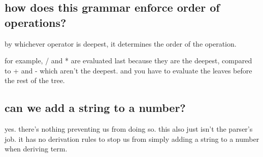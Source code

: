 \documentclass[12pt]{article}
\begin{document}
\subsection*{how does this grammar enforce order of operations?}

by whichever operator is deepest, it determines the order of the operation.

for example, / and * are evaluated last because they are the deepest, compared to + and - which
aren't the deepest. and you have to evaluate the leaves before the rest of the tree.

\subsection*{can we add a string to a number?}

yes. there's nothing preventing us from doing so. this also just isn't the parser's
job. it has no derivation rules to stop us from simply adding a string to a number when deriving term.
\end{document}
